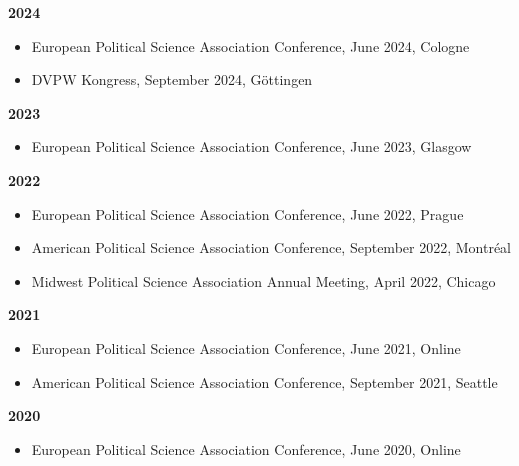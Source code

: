 \vspace{\baselineskip}

\textbf{2024}
\begin{itemize}[topsep=0pt, noitemsep, leftmargin=3]
	\item European Political Science Association Conference, June 2024, Cologne
    \item DVPW Kongress, September 2024, Göttingen
\end{itemize}

\vspace{\baselineskip}

\textbf{2023}
\begin{itemize}[topsep=0pt, noitemsep, leftmargin=3]
	\item European Political Science Association Conference, June 2023, Glasgow
\end{itemize}


\vspace{\baselineskip}

\textbf{2022}
\begin{itemize}[topsep=0pt, noitemsep, leftmargin=3]
	\item European Political Science Association Conference, June 2022, Prague
	\item American Political Science Association Conference, September 2022, Montréal
	\item Midwest Political Science Association Annual Meeting, April 2022, Chicago
\end{itemize}

\vspace{\baselineskip}

\textbf{2021}
\begin{itemize}[topsep=0pt, noitemsep, leftmargin=3]
	\item European Political Science Association Conference, June 2021, Online
	\item American Political Science Association Conference, September 2021, Seattle
\end{itemize}

\vspace{\baselineskip}

\textbf{2020}
\begin{itemize}[topsep=0pt, noitemsep, leftmargin=3]
	\item European Political Science Association Conference, June 2020, Online
\end{itemize}

